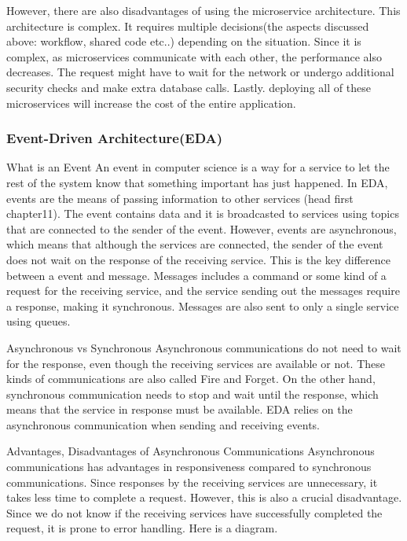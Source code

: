 However, there are also disadvantages of using the microservice architecture. 
This architecture is complex. It requires multiple decisions(the aspects discussed above: workflow, shared code etc..) 
depending on the situation. Since it is complex, as microservices communicate with each other, the performance also decreases.
 The request might have to wait for the network or undergo additional security checks and make extra database calls.
  Lastly. deploying all of these microservices will increase the cost of the entire application.  

\subsubsection[Event-Driven Architecture(EDA)]{Event-Driven Architecture(EDA)}
What is an Event
An event in computer science is a way for a service to let the rest of the system know that something important has just happened. In EDA, events are the means of passing information to other services (head first chapter11). The event contains data and it is broadcasted to services using topics that are connected to the sender of the event. However, events are asynchronous, which means that although the services are connected, the sender of the event does not wait on the response of the receiving service. This is the key difference between a event and message. Messages includes a command or some kind of a request for the receiving service, and the service sending out the messages require a response, making it synchronous. Messages are also sent to only a single service using queues. 

Asynchronous vs Synchronous
Asynchronous communications do not need to wait for the response, even though the receiving services are available or not. These kinds of communications are also called Fire and Forget. On the other hand, synchronous communication needs to stop and wait until the response, which means that the service in response must be available. EDA relies on the asynchronous communication when sending and receiving events.

Advantages, Disadvantages of Asynchronous Communications
Asynchronous communications has advantages in responsiveness compared to synchronous communications. Since responses by the receiving services are unnecessary, it takes less time to complete a request. However, this is also a crucial disadvantage. Since we do not know if the receiving services have successfully completed the request, it is prone to error handling. Here is a diagram. 

